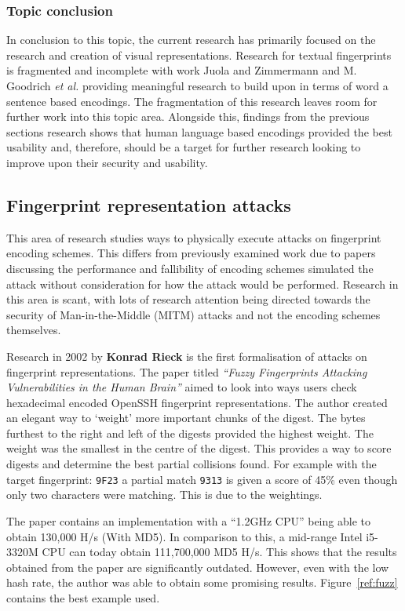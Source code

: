 \subsubsection{Topic conclusion}

In conclusion to this topic, the current research has primarily focused on the research and creation of visual representations. Research for textual fingerprints is fragmented and incomplete with work Juola and Zimmermann 
\cite{juola1996whole} and M. Goodrich \textit{et al.}\cite{goodrich2006loud} providing meaningful research to build upon in terms of word a sentence based encodings. The fragmentation of this research leaves room for further work into this topic area. Alongside this, findings from the previous sections research shows that human language based encodings provided the best usability and, therefore, should be a target for further research looking to improve upon their security and usability.

\subsection{Fingerprint representation attacks}
This area of research studies ways to physically execute attacks on fingerprint encoding schemes. This differs from previously examined work due to papers discussing the performance and fallibility of encoding schemes simulated the attack without consideration for how the attack would be performed. Research in this area is scant, with lots of research attention being directed towards the security of Man-in-the-Middle (MITM) attacks and not the encoding schemes themselves.

Research in 2002 by \textbf{Konrad Rieck}\cite{rieck2002fuzzy} is the first formalisation of attacks on fingerprint representations. The paper titled \textit{``Fuzzy Fingerprints Attacking Vulnerabilities in the Human Brain''}
aimed to look into ways users check hexadecimal encoded OpenSSH fingerprint representations. The author created an elegant way to `weight' more important chunks of the digest. The bytes furthest to the right and left of the digests provided the highest weight. The weight was the smallest in the centre of the digest. This provides a way to score digests and determine the best partial collisions found. For example with the target fingerprint: \verb|9F23| a partial match \verb|9313| is given a score of 45\% even though only two characters were matching. This is due to the weightings.

The paper contains an implementation with a ``1.2GHz CPU'' being able to obtain 130,000 H/s (With MD5). In comparison to this, a mid-range Intel i5-3320M CPU can today obtain 111,700,000 MD5 H/s. This shows that the results obtained from the paper are significantly outdated. However, even with the low hash rate, the author was able to obtain some promising results. Figure~\ref{ref:fuzz} contains the best example used.

